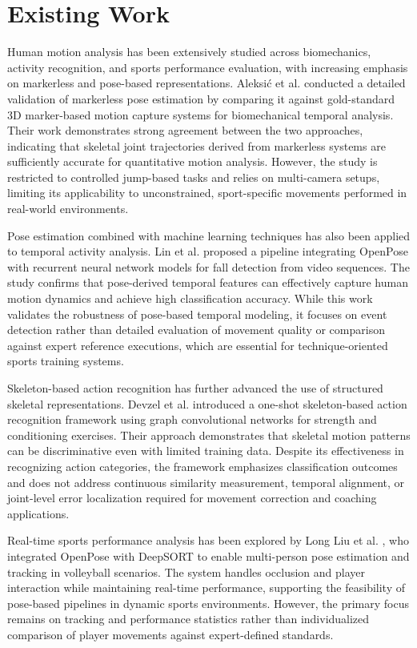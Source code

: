 \documentclass[12pt, a4paper]{report}
\begin{document}
\section{Existing Work}
Human motion analysis has been extensively studied across biomechanics, activity recognition, and sports performance evaluation, with increasing emphasis on markerless and pose-based representations. Aleksić et al. \cite{aleksic} conducted a detailed validation of markerless pose estimation by comparing it against gold-standard 3D marker-based motion capture systems for biomechanical temporal analysis. Their work demonstrates strong agreement between the two approaches, indicating that skeletal joint trajectories derived from markerless systems are sufficiently accurate for quantitative motion analysis. However, the study is restricted to controlled jump-based tasks and relies on multi-camera setups, limiting its applicability to unconstrained, sport-specific movements performed in real-world environments.

Pose estimation combined with machine learning techniques has also been applied to temporal activity analysis. Lin et al. \cite{lin} proposed a pipeline integrating OpenPose with recurrent neural network models for fall detection from video sequences. The study confirms that pose-derived temporal features can effectively capture human motion dynamics and achieve high classification accuracy. While this work validates the robustness of pose-based temporal modeling, it focuses on event detection rather than detailed evaluation of movement quality or comparison against expert reference executions, which are essential for technique-oriented sports training systems.

Skeleton-based action recognition has further advanced the use of structured skeletal representations. Devzel et al. \cite{devzel} introduced a one-shot skeleton-based action recognition framework using graph convolutional networks for strength and conditioning exercises. Their approach demonstrates that skeletal motion patterns can be discriminative even with limited training data. Despite its effectiveness in recognizing action categories, the framework emphasizes classification outcomes and does not address continuous similarity measurement, temporal alignment, or joint-level error localization required for movement correction and coaching applications.

Real-time sports performance analysis has been explored by Long Liu et al. \cite{liu}, who integrated OpenPose with DeepSORT to enable multi-person pose estimation and tracking in volleyball scenarios. The system handles occlusion and player interaction while maintaining real-time performance, supporting the feasibility of pose-based pipelines in dynamic sports environments. However, the primary focus remains on tracking and performance statistics rather than individualized comparison of player movements against expert-defined standards.
\end{document}
